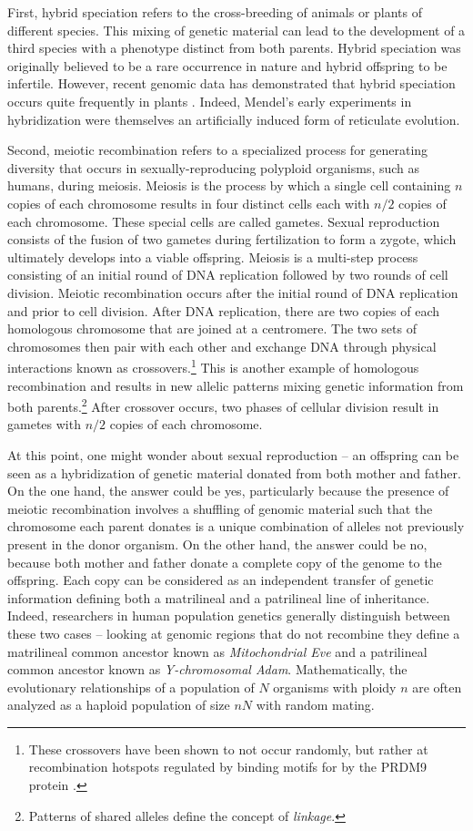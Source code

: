 First, hybrid speciation refers to the cross-breeding of animals or plants of different species.
This mixing of genetic material can lead to the development of a third species with a phenotype distinct from both parents.
Hybrid speciation was originally believed to be a rare occurrence in nature and hybrid offspring to be infertile.
However, recent genomic data has demonstrated that hybrid speciation occurs quite frequently in plants \cite{Arnold:1996,Arnold:2007vq}.
Indeed, Mendel's early experiments in hybridization were themselves an artificially induced form of reticulate evolution.

Second, meiotic recombination refers to a specialized process for generating diversity that occurs in sexually-reproducing polyploid organisms, such as humans, during meiosis.
Meiosis is the process by which a single cell containing $n$ copies of each chromosome results in four distinct cells each with $n/2$ copies of each chromosome.
These special cells are called gametes.
Sexual reproduction consists of the fusion of two gametes during fertilization to form a zygote, which ultimately develops into a viable offspring.
Meiosis is a multi-step process consisting of an initial round of DNA replication followed by two rounds of cell division.
Meiotic recombination occurs after the initial round of DNA replication and prior to cell division.
After DNA replication, there are two copies of each homologous chromosome that are joined at a centromere.
The two sets of chromosomes then pair with each other and exchange DNA through physical interactions known as crossovers.\footnote{These crossovers have been shown to not occur randomly, but rather at recombination hotspots regulated by binding motifs for by the PRDM9 protein \cite{Baudat:2010ii,Camara:2016}.}
This is another example of homologous recombination and results in new allelic patterns mixing genetic information from both parents.\footnote{Patterns of shared alleles define the concept of \emph{linkage}.}
After crossover occurs, two phases of cellular division result in gametes with $n/2$ copies of each chromosome.

At this point, one might wonder about sexual reproduction -- an offspring can be seen as a hybridization of genetic material donated from both mother and father.
On the one hand, the answer could be yes, particularly because the presence of meiotic recombination involves a shuffling of genomic material such that the chromosome each parent donates is a unique combination of alleles not previously present in the donor organism.
On the other hand, the answer could be no, because both mother and father donate a complete copy of the genome to the offspring.
Each copy can be considered as an independent transfer of genetic information defining both a matrilineal and a patrilineal line of inheritance.
Indeed, researchers in human population genetics generally distinguish between these two cases -- looking at genomic regions that do not recombine they define a matrilineal common ancestor known as \emph{Mitochondrial Eve} and a patrilineal common ancestor known as \emph{Y-chromosomal Adam}.
Mathematically, the evolutionary relationships of a population of $N$ organisms with ploidy $n$ are often analyzed as a haploid population of size $nN$ with random mating.

